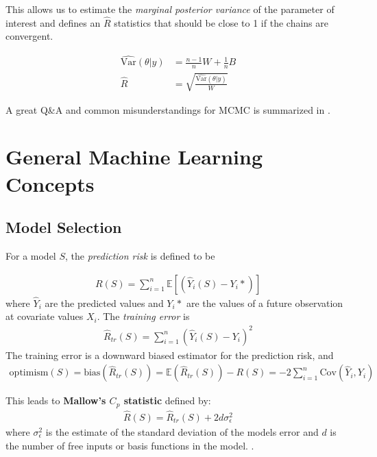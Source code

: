 \documentclass[12pt]{article}
\newcommand{\EE}{\ensuremath{\mathbb{E}}}
\begin{document}
This allows us to estimate the {\sl marginal posterior variance} of the
parameter of interest and defines an $\hat R$ statistics that should be close to 1 if the chains are
convergent.

\begin{align*}
    \widehat{ \text{Var}}(\theta | y) &= \frac{n-1}{n} W + \frac{1}{n} B\\[2ex]
  \hat{R} &= \sqrt{\frac{\widehat{\text{Var}}(\theta | y)}{W}}
\end{align*}



\bigskip

A great Q\&A and common misunderstandings for MCMC is summarized in \cite{robert2020markov}.

\printbibliography[heading=subbibnumbered]
\pagebreak

\section{General Machine Learning Concepts}

\newrefsection

\subsection{Model Selection}

For a model $S$, the {\sl prediction risk} is defined to be 

\begin{align*}
  R(S) = \sum_{i=1}^n \EE[ (\hat Y_i(S) - Y_i*)]
\end{align*}
where $\hat Y_i$ are the predicted values and $Y_i*$ are the values of a future
observation at covariate values $X_i$. The {\sl training error} is
\begin{align*}
  \hat R_{tr}(S) = \sum_{i=1}^n \left(\hat Y_i(S) - Y_i \right)^2
\end{align*}
The training error is a downward biased estimator for the prediction risk, and
\begin{align*}
  \text{optimism}(S) = \text{bias}\left( \hat R_{tr}(S) \right) = \EE(\hat R_{tr}(S)) - R(S) = -2 \sum_{i=1}^n \text{Cov}(\hat Y_i, Y_i)
\end{align*}

This leads to {\bf Mallow's $C_p$ statistic} defined by:
\begin{align*}
  \hat R(S) = \hat R_{tr}(S) + 2 d \sigma_\epsilon^2
\end{align*}
where $\sigma_\epsilon^2$ is the estimate of the standard deviation of the
models error and $d$ is the number of free inputs or basis functions in the model. 
\cite[\S7.4]{esl}.
\end{document}
